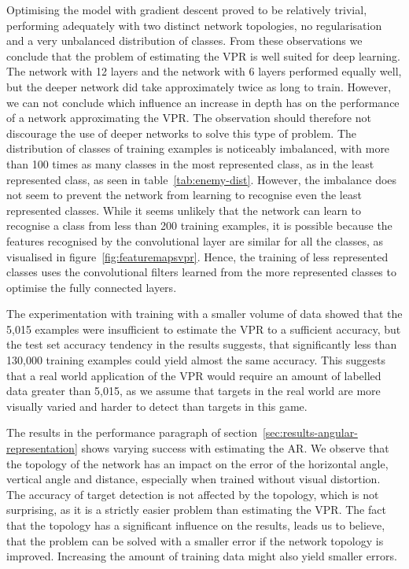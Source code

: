 Optimising the model with gradient descent proved to be relatively trivial, performing adequately with two distinct network topologies, no regularisation and a very unbalanced distribution of classes. From these observations we conclude that the problem of estimating the VPR is well suited for deep learning. The network with 12 layers and the network with 6 layers performed equally well, but the deeper network did take approximately twice as long to train. 
However, we can not conclude which influence an increase in depth has on the performance of a network approximating the VPR. 
The observation should therefore not discourage the use of deeper networks to solve this type of problem. The distribution of classes of training examples is noticeably imbalanced, with more than 100 times as many classes in the most represented class, as in the least represented class, as seen in table~\ref{tab:enemy-dist}. However, the imbalance does not seem to prevent the network from learning to recognise even the least represented classes. While it seems unlikely that the network can learn to recognise a class from less than 200 training examples, it is possible because the features recognised by the convolutional layer are similar for all the classes, as visualised in figure~\ref{fig:featuremapsvpr}. Hence, the training of less represented classes uses the convolutional filters learned from the more represented classes to optimise the fully connected layers.

The experimentation with training with a smaller volume of data showed that the 5,015 examples were insufficient to estimate the VPR to a sufficient accuracy, but the test set accuracy tendency in the results suggests, that significantly less than 130,000 training examples could yield almost the same accuracy. This suggests that a real world application of the VPR would require an amount of labelled data greater than 5,015, as we assume that targets in the real world are more visually varied and harder to detect than targets in this game.

The results in the performance paragraph of section~\ref{sec:results-angular-representation} shows varying success with estimating the AR. We observe that the topology of the network has an impact on the error of the horizontal angle, vertical angle and distance, especially when trained without visual distortion. The accuracy of target detection is not affected by the topology, which is not surprising, as it is a strictly easier problem than estimating the VPR. The fact that the topology has a significant influence on the results, leads us to believe, that the problem can be solved with a smaller error if the network topology is improved. Increasing the amount of training data might also yield smaller errors.

